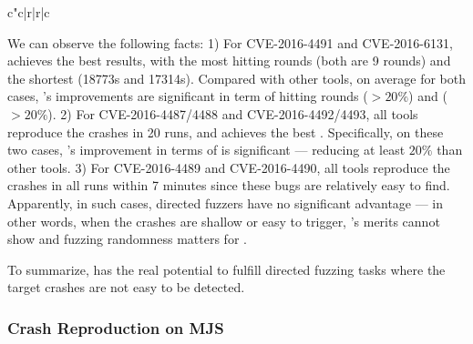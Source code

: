 \begin{table}[t]
\begin{tabular}{c"c|r|r|c}
\end{tabular}  
\end{table}

We can observe the following facts: 
1) For CVE-2016-4491 and CVE-2016-6131, \dFOT achieves the best results, with the most hitting rounds (both are 9 rounds) and the shortest {\utte} (18773s and 17314s). Compared with other tools, on average for both cases, \dFOT's improvements are significant in term of hitting rounds ($>20\%$) and {\utte} ($>20\%$).
2) For CVE-2016-4487/4488 and CVE-2016-4492/4493, all tools reproduce the crashes in 20 runs, and \dFOT achieves the best {\utte}. Specifically, on these two cases, \dFOT's improvement in terms of {\utte} is significant --- reducing at least $20\%$ than other tools.
3) For CVE-2016-4489 and CVE-2016-4490, all tools reproduce the crashes in all runs within 7 minutes since these bugs are relatively easy to find. 
Apparently, in such cases, directed fuzzers have no significant advantage --- in other words, when the crashes are shallow or easy to trigger, \dFOT's merits cannot show and fuzzing randomness matters for \utte.

To summarize, {\dFOT} has the real potential to fulfill directed fuzzing tasks where the target crashes are not easy to be detected.

\subsubsection{Crash Reproduction on MJS}

